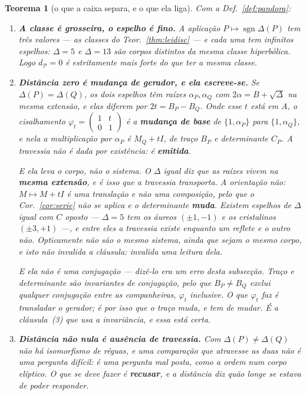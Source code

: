 \documentclass[11pt,a4paper]{article}
\newtheorem{teorema}{Teorema}
\begin{document}
\begin{teorema}[o que a caixa separa, e o que ela liga]\label{thm:pandora}
Com a Def.~\ref{def:pandora}:
\begin{enumerate}\itemsep3pt
\item[(1)] \textbf{A classe é grosseira, o espelho é fino.} A aplicação
$P\mapsto\operatorname{sgn}\Delta(P)$ tem \emph{três} valores --- as classes do
Teor.~\ref{thm:leidisc} --- e cada uma tem infinitos espelhos: $\Delta=5$ e
$\Delta=13$ são \emph{corpos distintos da mesma classe hiperbólica}. Logo
$d_{\mathcal{P}}=0$ é estritamente mais forte do que ter a mesma classe.
\item[(2)] \textbf{Distância zero é mudança de gerador, e ela escreve-se.} Se
$\Delta(P)=\Delta(Q)$, os dois espelhos têm raízes
$\alpha_P,\alpha_Q$ com $2\alpha=B+\sqrt{\Delta}$ na mesma extensão, e elas
diferem por $2t=B_P-B_Q$. Onde esse $t$ está em $A$, o cisalhamento
$\varphi_t=\left(\begin{smallmatrix}1&t\\0&1\end{smallmatrix}\right)$ é a
\textbf{mudança de base} de $\{1,\alpha_P\}$ para $\{1,\alpha_Q\}$, e nela a
multiplicação por $\alpha_P$ é $M_Q+tI$, de traço $B_P$ e determinante $C_P$. A
travessia não é dada por existência: é \textbf{emitida}.

\emph{E ela leva o corpo, não o sistema.} O $\Delta$ igual diz que as raízes vivem
na \textbf{mesma extensão}, e é isso que a travessia transporta. A
\emph{orientação} não: $M\mapsto M+tI$ é uma translação e não uma composição,
pelo que o Cor.~\ref{cor:serie} não se aplica e o determinante \textbf{muda}.
Existem espelhos de $\Delta$ igual com $C$ oposto --- $\Delta=5$ tem os áureos
$(\pm1,-1)$ e os cristalinos $(\pm3,+1)$ ---, e entre eles a travessia existe
enquanto um \emph{reflete} e o outro não. \emph{Opticamente não são o mesmo
sistema, ainda que sejam o mesmo corpo}, e isto não invalida a cláusula: invalida
uma leitura dela.

\emph{E ela não é uma conjugação} --- dizê-lo era um erro desta subsecção. Traço
e determinante são invariantes de conjugação, pelo que $B_P\neq B_Q$ exclui
\emph{qualquer} conjugação entre as companheiras, $\varphi_t$ inclusive. O que
$\varphi_t$ faz é transladar o gerador; é por isso que o traço muda, e tem de
mudar. É a cláusula~(3) que usa a invariância, e essa está certa.
\item[(3)] \textbf{Distância não nula é ausência de travessia.} Com
$\Delta(P)\neq\Delta(Q)$ não há isomorfismo de réguas, e uma comparação que
atravesse as duas não é uma pergunta difícil: é uma pergunta \emph{mal posta},
como a ordem num corpo elíptico. O que se deve fazer é \textbf{recusar}, e a
distância diz \emph{quão} longe se estava de poder responder.
\end{enumerate}
\end{teorema}
\end{document}
